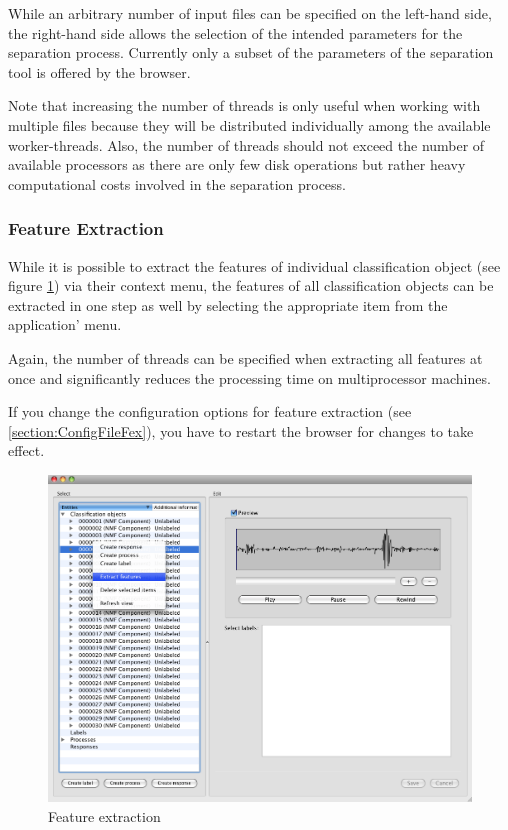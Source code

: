 While an arbitrary number of input files can be specified on the left-hand side,
the right-hand side allows the selection of the intended parameters for the
separation process. Currently only a subset of the parameters of the separation
tool is offered by the browser.

Note that increasing the number of threads is only useful when working with
multiple files because they will be distributed individually among the available
worker-threads. Also, the number of threads should not exceed the number of
available processors as there are only few disk operations but rather heavy
computational costs involved in the separation process.


\subsubsection{Feature Extraction}

While it is possible to extract the features of individual classification object
(see figure \ref{figure:FeatureExtraction}) via their context menu, the features
of all classification objects can be extracted in one step as well by selecting
the appropriate item from the application' menu.

Again, the number of threads can be specified when extracting all features at
once and significantly reduces the processing time on multiprocessor machines.

\begin{leftbar}
    If you change the configuration options for feature extraction (see
    \ref{section:ConfigFileFex}), you have to restart the browser for changes to
    take effect.
\end{leftbar}

\begin{figure}
    \includegraphics[width=\textwidth]{images/FeatureExtraction.png}
    \caption{%
        \label{figure:FeatureExtraction}%
        Feature extraction
    }
\end{figure}


